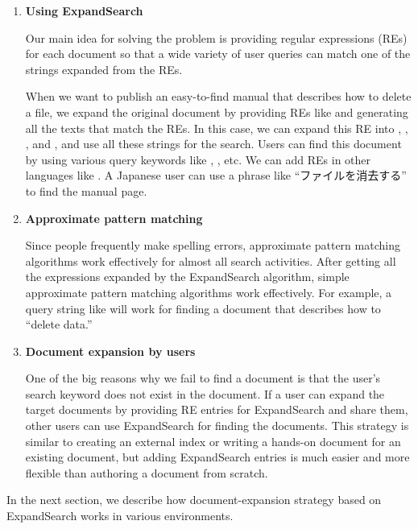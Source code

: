 \documentclass[manuscript,anonymous,review]{acmart}
\def\ES{\textsf{ExpandSearch}}
\begin{document}
\begin{enumerate}
  
\item \textbf{Using ExpandSearch}
  
  Our main idea for solving the problem is 
  providing regular expressions (REs)
  for  each document so that a wide variety of user queries can match one of the
  strings expanded from the REs.
  
  When we want to publish an easy-to-find manual that describes how to delete a file,
  we expand the original document by
  providing REs like 
  and generating all the texts that match the REs.
  In this case, we can expand this RE into
  ,
  ,
  , and
  ,
  and use all these strings for the search.
  Users can find this document by using various query keywords like
  , , etc.
  We can add REs in other languages
  like .
  A Japanese user can use a phrase like ``ファイルを消去する'' to find the manual page.

\item \textbf{Approximate pattern matching}

  Since people frequently make spelling errors,
  approximate pattern matching algorithms
  work effectively for almost all search activities.
  After getting all the expressions expanded by the {\ES} algorithm,
  simple approximate pattern matching algorithms work effectively.
  For example, a query string like  will work for
  finding a document that describes how to ``delete data.''

\item \textbf{Document expansion by users}

  One of the big reasons why we fail to find a document is that
  the user's search keyword does not exist in the document.
  If a user can expand the target documents by
  providing RE entries for {\ES} and share them,
  other users can use {\ES} for finding the documents.
  This strategy is similar to creating an external index or
  writing a hands-on document for an existing document,
  but adding {\ES} entries is much easier and more flexible than
  authoring a document from scratch.

\end{enumerate}

In the next section, we describe how
document-expansion strategy based on {\ES} works in various environments.
\end{document}
